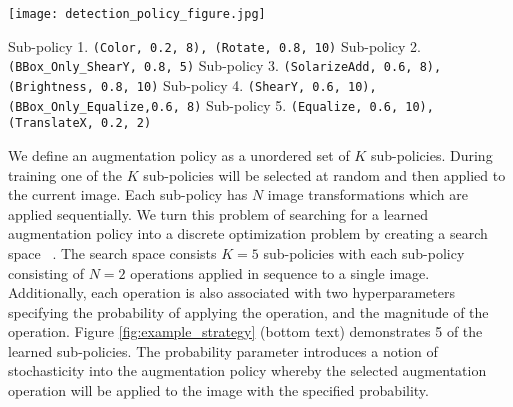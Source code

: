 \documentclass[10pt,twocolumn,letterpaper]{article}
\newcommand{\cmd}[1]{{\tt #1}}
\begin{document}
\begin{figure*}[t]
\centering
\texttt{[image: detection\_policy\_figure.jpg]}
\vspace{-0.2cm}
\small{
\begin{flushleft}
\hspace*{4.4cm} Sub-policy 1. \cmd{(Color, 0.2, 8), (Rotate, 0.8, 10)}\newline
\hspace*{4.4cm} Sub-policy 2. \cmd{(BBox\_Only\_ShearY, 0.8, 5)} \newline
\hspace*{4.4cm} Sub-policy 3. \cmd{(SolarizeAdd, 0.6, 8), (Brightness, 0.8, 10)} \newline
\hspace*{4.4cm} Sub-policy 4. \cmd{(ShearY, 0.6, 10), (BBox\_Only\_Equalize,0.6, 8)} \newline
\hspace*{4.4cm} Sub-policy 5. \cmd{(Equalize, 0.6, 10), (TranslateX, 0.2, 2)} \newline
\end{flushleft}
}
\vspace{-0.6cm}
\caption{\textbf{Examples of learned augmentation sub-policies.} 5 examples of learned sub-policies applied to one example image. Each column corresponds to a different random sample of the corresponding sub-policy. Each step of an augmentation sub-policy consists of a triplet corresponding to the operation, the probability of application and a magnitude measure. The bounding box is adjusted to maintain consistency with the applied augmentation. Note the probability and magnitude are discretized values (see text for details). }
\label{fig:example_strategy}
\end{figure*}

We define an augmentation policy as a unordered set of $K$ sub-policies. During training one of the $K$ sub-policies will be selected at random and then applied to the current image. Each sub-policy has $N$ image transformations which are applied sequentially. We turn this problem of searching for a learned augmentation policy into a discrete optimization problem by creating a search space ~\cite{cubuk2018autoaugment}.
The search space consists $K=5$ sub-policies with each sub-policy consisting of $N=2$ operations applied in sequence to a single image. Additionally, each operation is also associated with two hyperparameters specifying the probability of applying the operation, and the magnitude of the operation. Figure \ref{fig:example_strategy} (bottom text) demonstrates 5 of the learned sub-policies. 
The probability parameter introduces a notion of stochasticity into the augmentation policy whereby the selected augmentation operation will be applied to the image with the specified probability.
\end{document}
